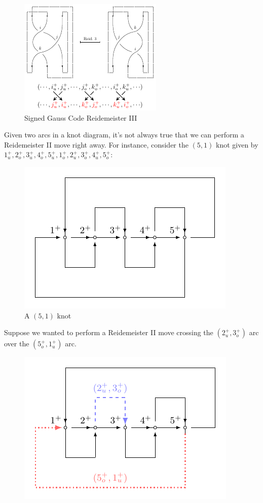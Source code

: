 \begin{figure}[H]
  \centering
  \includegraphics[scale=1.5]{figures/background/gauss-moves/gauss-r3-pair-b.pdf}
  \caption{Signed Gauss Code Reidemeister III}
\end{figure}
\begin{note}\label{note:gauss-code-reidemeister-2}
  Given two arcs in a knot diagram, it's not always true that we can
  perform a Reidemeister II move right away. For instance, consider
  the $(5,1)$ knot given by $1_u^+, 2_o^+, 3_u^+, 4_o^+, 5_u^+, 1_o^+,
  2_u^+, 3_o^+, 4_u^+, 5_o^+$:
  \begin{figure}[H]
    \centering
    \includegraphics[scale=.75]{figures/unknotting-moves-and-combinatorial-representations/5_1.pdf}
    \caption{A $(5,1)$ knot}
    \label{fig:Reidemeister-2-planarity-example}
  \end{figure}
  Suppose we wanted to perform a Reidemeister II move crossing the
  $(2^+_u, 3^+_o)$ arc over the $(5^+_o, 1^+_u)$ arc.
  \begin{figure}[H]
    \centering
    \includegraphics[scale=.75]{figures/unknotting-moves-and-combinatorial-representations/5_1_r2_arcs.pdf}

\end{figure}
\end{note}
